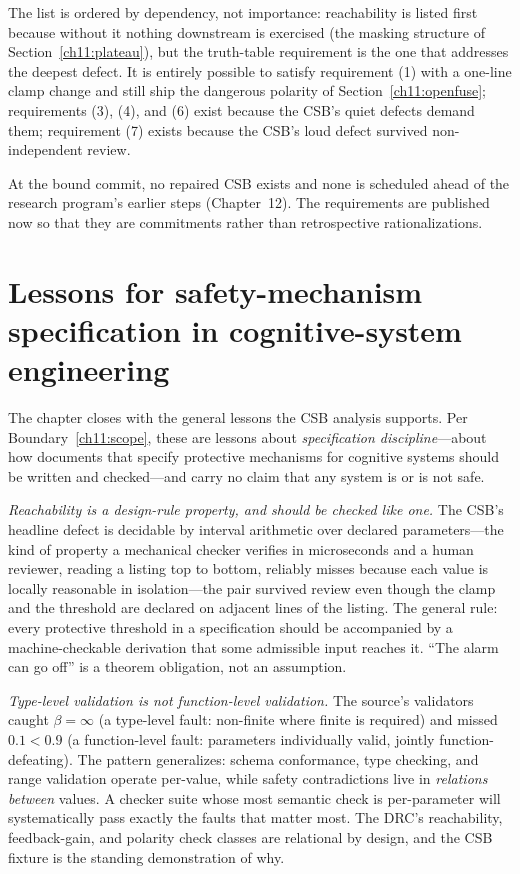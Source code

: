The list is ordered by dependency, not importance: reachability is listed first because without it nothing downstream is exercised (the masking structure of Section~\ref{ch11:plateau}), but the truth-table requirement is the one that addresses the deepest defect. It is entirely possible to satisfy requirement (1) with a one-line clamp change and still ship the dangerous polarity of Section~\ref{ch11:openfuse}; requirements (3), (4), and (6) exist because the CSB's quiet defects demand them; requirement (7) exists because the CSB's loud defect survived non-independent review.

\begin{remark}\label{ch11:rem-norepair}
At the bound commit, no repaired CSB exists and none is scheduled ahead of the research program's earlier steps (Chapter~12). The requirements are published now so that they are commitments rather than retrospective rationalizations.
\end{remark}

\section{Lessons for safety-mechanism specification in cognitive-system engineering}\label{ch11:lessons}

The chapter closes with the general lessons the CSB analysis supports. Per Boundary~\ref{ch11:scope}, these are lessons about \emph{specification discipline}---about how documents that specify protective mechanisms for cognitive systems should be written and checked---and carry no claim that any system is or is not safe.

\emph{Reachability is a design-rule property, and should be checked like one.} The CSB's headline defect is decidable by interval arithmetic over declared parameters---the kind of property a mechanical checker verifies in microseconds and a human reviewer, reading a listing top to bottom, reliably misses because each value is locally reasonable in isolation---the pair survived review even though the clamp and the threshold are declared on adjacent lines of the listing. The general rule: every protective threshold in a specification should be accompanied by a machine-checkable derivation that some admissible input reaches it. ``The alarm can go off'' is a theorem obligation, not an assumption.

\emph{Type-level validation is not function-level validation.} The source's validators caught $\beta=\infty$ (a type-level fault: non-finite where finite is required) and missed $0.1<0.9$ (a function-level fault: parameters individually valid, jointly function-defeating). The pattern generalizes: schema conformance, type checking, and range validation operate per-value, while safety contradictions live in \emph{relations between} values. A checker suite whose most semantic check is per-parameter will systematically pass exactly the faults that matter most. The DRC's reachability, feedback-gain, and polarity check classes are relational by design, and the CSB fixture is the standing demonstration of why.

